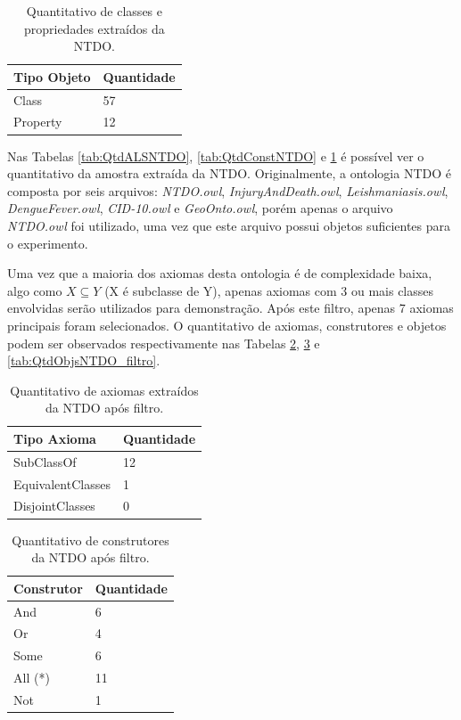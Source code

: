 \documentclass{bcc}
\begin{document}
\begin{table}[H]
\centering
\begin{tabular}{|l|l|}
\hline
Tipo Objeto   & Quantidade \\ \hline
Class         & 57         \\ \hline
Property      & 12         \\ \hline
\end{tabular}
\caption{Quantitativo de classes e propriedades extraídos da NTDO.}
\label{tab:QtdObjsNTDO}
\end{table}

Nas Tabelas \ref{tab:QtdALSNTDO},  \ref{tab:QtdConstNTDO} e \ref{tab:QtdObjsNTDO} é possível ver o quantitativo da amostra extraída da NTDO. Originalmente, a ontologia NTDO é composta por seis arquivos: \textit{NTDO.owl}, \textit{InjuryAndDeath.owl}, \textit{Leishmaniasis.owl}, \textit{DengueFever.owl}, \textit{CID-10.owl} e \textit{GeoOnto.owl}, porém apenas o arquivo \textit{NTDO.owl} foi utilizado, uma vez que este arquivo possui objetos suficientes para o experimento.

Uma vez que a maioria dos axiomas desta ontologia é de complexidade baixa, algo como  $X \subseteq Y$ (X é subclasse de Y), apenas axiomas com 3 ou mais classes envolvidas serão utilizados para demonstração. Após este filtro, apenas 7 axiomas principais foram selecionados. O quantitativo de axiomas, construtores e objetos podem ser observados respectivamente nas Tabelas \ref{tab:QtdALSNTDO_filtro}, \ref{tab:QtdConstNTDO_filtro} e \ref{tab:QtdObjsNTDO_filtro}.

\begin{table}[H]
\centering
\begin{tabular}{|l|l|}
\hline
Tipo Axioma       & Quantidade \\ \hline
SubClassOf        & 12         \\ \hline
EquivalentClasses & 1          \\ \hline
DisjointClasses   & 0          \\ \hline
\end{tabular}
\caption{Quantitativo de axiomas extraídos da NTDO após filtro.}
\label{tab:QtdALSNTDO_filtro}
\end{table}

\begin{table}[H]
\centering
\begin{tabular}{|l|l|}
\hline
Construtor & Quantidade \\ \hline
And        & 6          \\ \hline
Or         & 4          \\ \hline
Some       & 6          \\ \hline
All (*)    & 11         \\ \hline
Not        & 1         \\ \hline
\end{tabular}
\caption{Quantitativo de construtores da NTDO após filtro.}
\label{tab:QtdConstNTDO_filtro}
\end{table}
\end{document}
